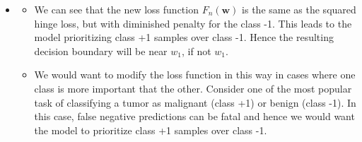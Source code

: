\documentclass{article}
\newcommand{\mathbi}[1]{\boldsymbol{#1}}
\begin{document}
\begin{itemize}
    \item[2.]
    \begin{itemize}
      \item[(a)] We can see that the new loss function $F_n(\mathbi{w})$ is the same as the squared hinge loss, but with diminished penalty for the class -1.
      This leads to the model prioritizing class +1 samples over class -1.
      Hence the resulting decision boundary will be near $w_1$, if not $w_1$.

      \item[(b)] We would want to modify the loss function in this way in cases where one class is more important that the other.
      Consider one of the most popular task of classifying a tumor as malignant (class +1) or benign (class -1).
      In this case, false negative predictions can be fatal and hence we would want the model to prioritize class +1 samples over class -1.


\end{itemize}
\end{itemize}
\end{document}
